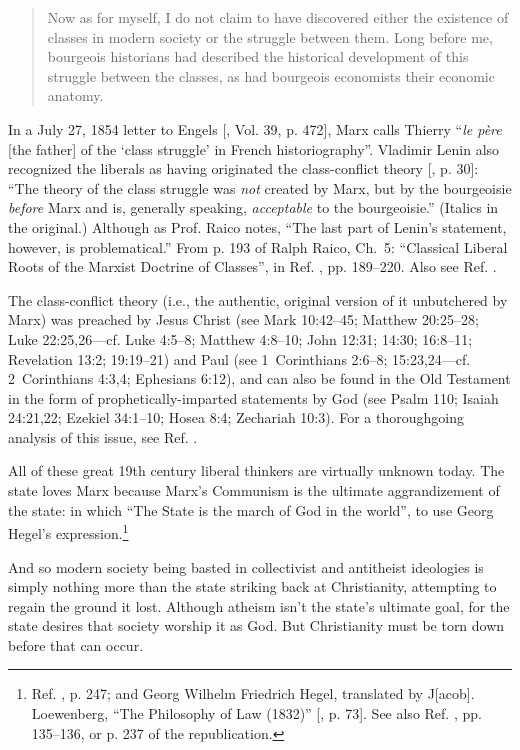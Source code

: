 \documentclass[letterpaper,12pt]{article}
\begin{document}
{\begin{quotation}
Now as for myself, I do not claim to have discovered either the existence of classes in modern society or the struggle between them. Long before me, bourgeois historians had described the historical development of this struggle between the classes, as had bourgeois economists their economic anatomy.
\end{quotation} In a July 27, 1854 letter to Engels [, Vol. 39, p. 472], Marx calls Thierry ``\emph{le p\`{e}re} [the father] of the `class struggle' in French historiography''. Vladimir Lenin also recognized the liberals as having originated the class-conflict theory [, p. 30]: ``The theory of the class struggle was \emph{not} created by Marx, but by the bourgeoisie \emph{before} Marx and is, generally speaking, \emph{acceptable} to the bourgeoisie.'' (Italics in the original.) Although as Prof. Raico notes, ``The last part of Lenin's statement, however, is problematical.'' From p. 193 of Ralph Raico, Ch.~5: ``Classical Liberal Roots of the Marxist Doctrine of Classes'', in Ref. , pp. 189--220. Also see Ref. .\par
    The class-conflict theory (i.e., the authentic, original version of it unbutchered by Marx) was preached by Jesus Christ (see Mark 10:42--45; Matthew 20:25--28; Luke 22:25,26---cf. Luke 4:5--8; Matthew 4:8--10; John 12:31; 14:30; 16:8--11; Revelation 13:2; 19:19--21) and Paul (see 1~Corinthians 2:6--8; 15:23,24---cf. 2~Corinthians 4:3,4; Ephesians 6:12), and can also be found in the Old Testament in the form of prophetically-imparted statements by God (see Psalm 110; Isaiah 24:21,22; Ezekiel 34:1--10; Hosea 8:4; Zechariah 10:3). For a thoroughgoing analysis of this issue, see Ref. .} All of these great 19th century liberal thinkers are virtually unknown today. The state loves Marx because Marx's Communism is the ultimate aggrandizement of the state: in which ``The State is the march of God in the world'', to use Georg Hegel's expression.\footnote{Ref. , p. 247; and Georg Wilhelm Friedrich Hegel, translated by J[acob]. Loewenberg, ``The Philosophy of Law (1832)'' [, p. 73]. See also Ref. , pp. 135--136, or p. 237 of the republication.}

And so modern society being basted in collectivist and antitheist ideologies is simply nothing more than the state striking back at Christianity, attempting to regain the ground it lost. Although atheism isn't the state's ultimate goal, for the state desires that society worship it as God. But Christianity must be torn down before that can occur.
\end{document}
